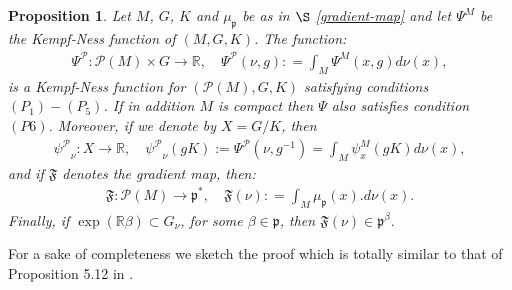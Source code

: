 \documentclass[leqno,11pt, a4]{amsart}
\newtheorem{prop}[equation]{Proposition}
\theoremstyle{named}
\begin{document}
\begin{prop} \label{P5M} Let $M$, $G$, $K$ and $ {\mu_{\mathfrak{p}}}$ be as in $\S$ \ref{gradient-map} and let $\Psi^M$ be the Kempf-Ness function of $(M,G,K)$. The function:
  \begin{gather}
    \label{defipsim} {\Psi^{\mathscr{P}}} : {\mathscr{P}}(M) \times G {\rightarrow} {\mathbb{R}}, \quad
    {\Psi^{\mathscr{P}}}(\nu, g) : = \int_M \Psi^M (x, g) d\nu(x),
  \end{gather}
  is a Kempf-Ness function for $({\mathscr{P}}(M), G, K)$ satisfying conditions $(P_1)-(P_5)$. If in addition $M$ is compact then $\Psi$ also satisfies condition $(P6)$.  Moreover, if we denote by $X=G/K$, then
  \begin{gather}
    \label{defipsima}
    {\psi^{\mathscr{P}}}_\nu : X {\rightarrow} {\mathbb{R}} , \quad {\psi^{\mathscr{P}}}_\nu( gK) := {\Psi^{\mathscr{P}}} (\nu,
    g{^{-1}}) = \int_M \psi^M_x(gK) d\nu(x),
  \end{gather}
  and if ${\mathfrak{F}}$ denotes the gradient map, then:
  \begin{gather}
    {\mathfrak{F}} : {\mathscr{P}}(M) {\rightarrow} {\mathfrak{p}}^*, \quad {\mathfrak{F}} (\nu) : = \int_M {\mu_{\mathfrak{p}}}(x).
    d\nu(x). \label{def-momento-misure}
  \end{gather}
Finally, if $\exp({\mathbb{R}} \beta)\subset G_\nu$, for some $\beta\in {\mathfrak{p}}$, then ${\mathfrak{F}}(\nu)\in {\mathfrak{p}}^\beta$.

\end{prop}
For a sake of completeness we sketch the proof which is totally similar to that of Proposition 5.12 in \cite{bgs}.
\end{document}

